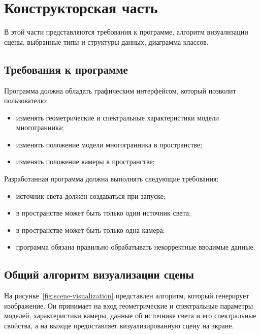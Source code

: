 \chapter{Конструкторская часть}

В этой части представляются требования к программе, алгоритм визуализации сцены, выбранные типы и структуры данных, диаграмма классов.

\section{Требования к программе}

Программа должна обладать графическим интерфейсом, который позволит пользователю:
\begin{itemize}[label=--]
	\item изменять геометрические и спектральные характеристики модели многогранника;
	\item изменять положение модели многогранника в пространстве;
	\item изменять положение камеры в пространстве;
\end{itemize}

Разработанная программа должна выполнять следующие требования:
\begin{itemize}[label=--]
	\item источник света должен создаваться при запуске;
	\item в пространстве может быть только один источник света;
	\item в пространстве может быть только одна камера;
	\item программа обязана правильно обрабатывать некорректные вводимые данные.
\end{itemize}

\section{Общий алгоритм визуализации сцены}

На рисунке~\ref{fig:scene-visualization} представлен алгоритм, который генерирует изображение. Он принимает на вход геометрические и спектральные параметры моделей, характеристики камеры, данные об источнике света и его спектральные свойства, а на выходе предоставляет визуализированную сцену на экране.

